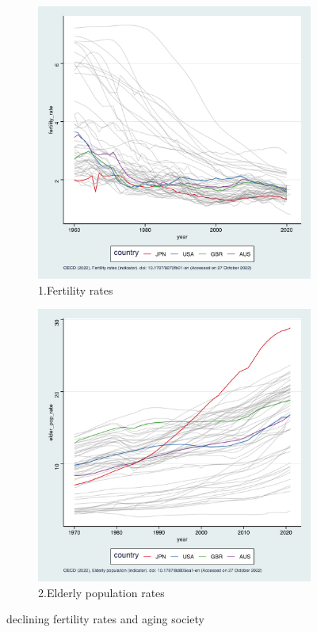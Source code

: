 \documentclass{article}
\theoremstyle{definition}
\begin{document}
\begin{figure}[h]
    \centering
    \begin{subfigure}{0.4\columnwidth}
        \centering
        \includegraphics[width=\columnwidth]{OECD_fertility_rates.png}
        \caption{1.Fertility rates}
    \end{subfigure}
    \begin{subfigure}{0.4\columnwidth}
        \centering
        \includegraphics[width=\columnwidth]{OECD_Elderly_pop_rate.png}
        \caption{2.Elderly population rates}
    \end{subfigure}
    \caption{declining fertility rates and aging society}
\end{figure}
\end{document}
